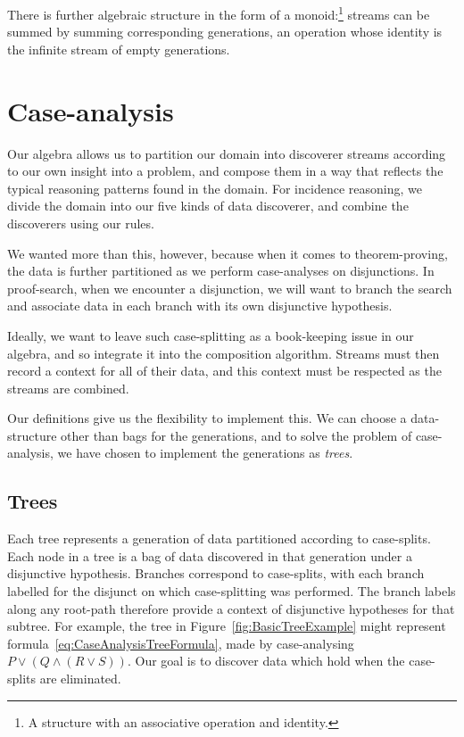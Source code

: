 There is further algebraic structure in the form of a monoid:\footnote{A structure with an associative operation and identity.} streams can be summed by summing corresponding generations, an operation whose identity is the infinite stream of empty generations. 

\section{Case-analysis}\label{sec:CaseAnalysis}
Our algebra allows us to partition our domain into discoverer streams according to our own insight into a problem, and compose them in a way that reflects the typical reasoning patterns found in the domain. For incidence reasoning, we divide the domain into our five kinds of data discoverer, and combine the discoverers using our rules.

We wanted more than this, however, because when it comes to theorem-proving, the data is further partitioned as we perform case-analyses on disjunctions. In proof-search, when we encounter a disjunction, we will want to branch the search and associate data in each branch with its own disjunctive hypothesis. 

Ideally, we want to leave such case-splitting as a book-keeping issue in our algebra, and so integrate it into the composition algorithm. Streams must then record a context for all of their data, and this context must be respected as the streams are combined. 

Our definitions give us the flexibility to implement this. We can choose a data-structure other than bags for the generations, and to solve the problem of case-analysis, we have chosen to implement the generations as \emph{trees}. 

\subsection{Trees}\label{sec:Trees}
Each tree represents a generation of data partitioned according to case-splits. Each node in a tree is a bag of data discovered in that generation under a disjunctive hypothesis. Branches correspond to case-splits, with each branch labelled for the disjunct on which case-splitting was performed. The branch labels along any root-path therefore provide a context of disjunctive hypotheses for that subtree. For example, the tree in Figure~\ref{fig:BasicTreeExample} might represent formula~\ref{eq:CaseAnalysisTreeFormula}, made by case-analysing \mbox{$P \vee (Q \wedge (R \vee S))$}. Our goal is to discover data which hold when the case-splits are eliminated.


